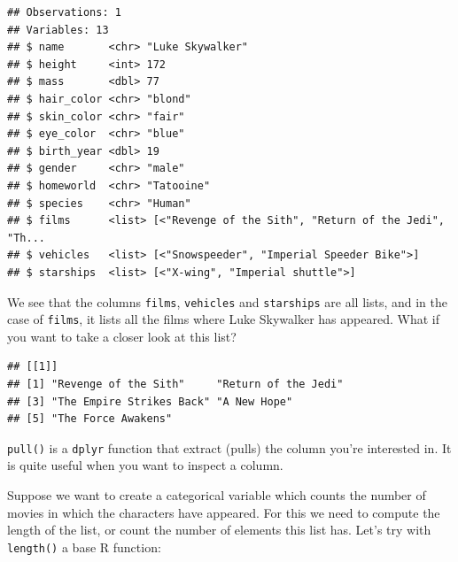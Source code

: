 \documentclass[]{gitbook}
\newenvironment{Shaded}{\begin{snugshade}}{\end{snugshade}}
\newcommand{\KeywordTok}[1]{\textcolor[rgb]{0.13,0.29,0.53}{\textbf{#1}}}
\newcommand{\NormalTok}[1]{#1}
\newcommand{\OperatorTok}[1]{\textcolor[rgb]{0.81,0.36,0.00}{\textbf{#1}}}
\newcommand{\StringTok}[1]{\textcolor[rgb]{0.31,0.60,0.02}{#1}}
\theoremstyle{definition}
\theoremstyle{definition}
\theoremstyle{definition}
\theoremstyle{remark}
\begin{document}
\begin{Shaded}
\end{Shaded}

\begin{verbatim}
## Observations: 1
## Variables: 13
## $ name       <chr> "Luke Skywalker"
## $ height     <int> 172
## $ mass       <dbl> 77
## $ hair_color <chr> "blond"
## $ skin_color <chr> "fair"
## $ eye_color  <chr> "blue"
## $ birth_year <dbl> 19
## $ gender     <chr> "male"
## $ homeworld  <chr> "Tatooine"
## $ species    <chr> "Human"
## $ films      <list> [<"Revenge of the Sith", "Return of the Jedi", "Th...
## $ vehicles   <list> [<"Snowspeeder", "Imperial Speeder Bike">]
## $ starships  <list> [<"X-wing", "Imperial shuttle">]
\end{verbatim}

We see that the columns \texttt{films}, \texttt{vehicles} and
\texttt{starships} are all lists, and in the case of \texttt{films}, it
lists all the films where Luke Skywalker has appeared. What if you want
to take a closer look at this list?

\begin{Shaded}
\end{Shaded}

\begin{verbatim}
## [[1]]
## [1] "Revenge of the Sith"     "Return of the Jedi"     
## [3] "The Empire Strikes Back" "A New Hope"             
## [5] "The Force Awakens"
\end{verbatim}

\texttt{pull()} is a \texttt{dplyr} function that extract (pulls) the
column you're interested in. It is quite useful when you want to inspect
a column.

Suppose we want to create a categorical variable which counts the number
of movies in which the characters have appeared. For this we need to
compute the length of the list, or count the number of elements this
list has. Let's try with \texttt{length()} a base R function:
\end{document}
